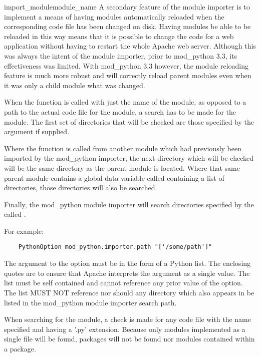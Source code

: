 \begin{funcdesc}{import_module}{module_name}
  A secondary feature of the module importer is to implement a means of
  having modules automatically reloaded when the corresponding code file
  has been changed on disk. Having modules be able to be reloaded in this
  way means that it is possible to change the code for a web application
  without having to restart the whole Apache web server. Although this was
  always the intent of the module importer, prior to mod_python 3.3, its
  effectiveness was limited. With mod_python 3.3 however, the module
  reloading feature is much more robust and will correctly reload parent
  modules even when it was only a child module what was changed.

  When the  function is called with just the
  name of the module, as opposed to a path to the actual code file for the
  module, a search has to be made for the module. The first set of
  directories that will be checked are those specified by the 
  argument if supplied.
  
  Where the function is called from another module which had previously
  been imported by the mod_python importer, the next directory which will
  be checked will be the same directory as the parent module is located.
  Where that same parent module contains a global data variable called
   containing a list of directories, those directories
  will also be searched.

  Finally, the mod_python module importer will search directories
  specified by the  called .

  For example:

  \begin{verbatim}
    PythonOption mod_python.importer.path "['/some/path']"
  \end{verbatim}

  The argument to the option must be in the form of a Python list. The
  enclosing quotes are to ensure that Apache interprets the argument as a
  single value. The list must be self contained and cannot reference any
  prior value of the option. The list MUST NOT reference 
  nor should any directory which also appears in  be
  listed in the mod_python module importer search path.

  When searching for the module, a check is made for any code file with the
  name specified and having a '.py' extension. Because only modules
  implemented as a single file will be found, packages will not be found
  nor modules contained within a package.


\end{funcdesc}
